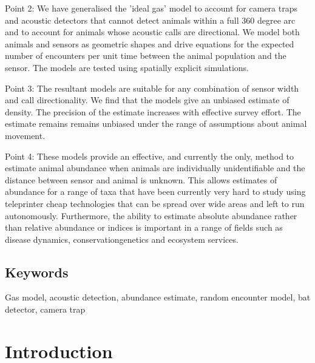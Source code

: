 \documentclass[a4paper,10pt,reqno,oneside]{amsart}
\begin{document}
Point 2: We have generalised the 'ideal gas' model to account for camera traps and acoustic detectors that cannot detect animals within a full 360 degree arc and to account for animals whose acoustic calls are directional. We model both animals and sensors as geometric shapes and drive equations for the expected number of encounters per unit time between the animal population and the sensor. The models are tested using spatially explicit simulations. 

Point 3: The resultant models are suitable for any combination of sensor width and call directionality. We find that the models give an unbiased estimate of density. The precision of the estimate increases with effective survey effort. The estimate remains remains unbiased under the range of assumptions about animal movement. 

Point 4: These models provide an effective, and currently the only, method to estimate animal abundance when animals are individually unidentifiable and the distance between sensor and animal is unknown. This allows estimates of abundance for a range of taxa that have been currently very hard to study using teleprinter cheap technologies that can be spread over wide areas and left to run autonomously. Furthermore, the ability to estimate absolute abundance rather than relative abundance or indices is important in a range of fields such as disease dynamics, conservationgenetics and ecosystem services. 

\subsection{Keywords}
Gas model, acoustic detection, abundance estimate, random encounter model, bat detector, camera trap

\section{Introduction}
\end{document}
